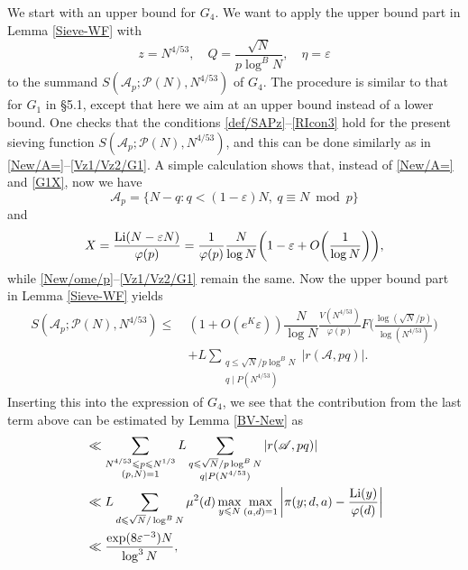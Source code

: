 \documentclass[12pt, a4paper]{amsart}
\def\Li{\hbox{{\rm Li}}}
\def\le{\leqslant}
\theoremstyle{plain}
\theoremstyle{remark}
\numberwithin{equation}{section}
\begin{document}
We start with an upper bound for $G_4$. We want to apply the upper bound part 
in Lemma \ref{Sieve-WF} with
\[
z=N^{4/53},\quad Q=\frac{\sqrt{N}}{p \log^{B} N},\quad \eta=\varepsilon
\] 
to the summand $S(\mathscr{A}_{p};\mathscr{P}(N), N^{4/53})$ of $G_4$. The procedure is 
similar to that for $G_1$ in \S 5.1, except that here we aim at an upper bound instead of a lower bound. 
One checks that the conditions \eqref{def/SAPz}--\eqref{RIcon3} hold for the present sieving function 
$S(\mathscr{A}_{p};\mathscr{P}(N), N^{4/53})$, and this can be done similarly as in 
\eqref{New/A=}--\eqref{Vz1/Vz2/G1}. A simple calculation shows that, 
instead of \eqref{New/A=} and \eqref{G1X}, now we have 
\begin{equation}\label{New/A=/G4}
\mathscr{A}_p=\{N-q: q<(1-\varepsilon)N, \ q\equiv N \bmod{p}\} 
\end{equation}
and 
\begin{equation}\label{G1X/G4}
X=\frac{\Li(N-\varepsilon N)}{\varphi(p)}
= \frac{1}{\varphi(p)} \frac{N}{\log N} \bigg(1-\varepsilon+O\bigg(\dfrac{1}{\log N}\bigg)\bigg), 
\end{equation}
while \eqref{New/ome/p}--\eqref{Vz1/Vz2/G1} remain the same. Now the upper bound part 
in Lemma \ref{Sieve-WF} yields 
\begin{equation}
\begin{split} 
S(\mathscr{A}_{p};\mathscr{P}(N), N^{4/53})
\le\ &  
(1+O(e^K\varepsilon))\dfrac{N}{\log N} 
\frac{V(N^{4/53})}{\varphi(p)} F\bigg(\frac{\log (\sqrt{N} / p)}{\log (N^{4/53})}\bigg) \\ 
& + L \sum\limits_{\substack{q\le\sqrt{N} /p\log^{B} N\\ q\mid P(N^{4/53})}}|r(\mathscr{A}, pq)|. 
\end{split}  
\end{equation}
Inserting this into the expression of $G_4$, we see that the contribution from the last term above 
can be estimated by Lemma \ref{BV-New} as 
\begin{equation}
\begin{split} 
&\ll\sum\limits_{\substack{N^{4/53}\le p\le N^{1/3}\\(p, N)=1}}L
\sum\limits_{\substack{q\le\sqrt{N} /p \log^{B} N\\ q\mid P(N^{4/53})}}|r(\mathscr{A}, pq)|\\ 
&\ll L\sum\limits_{d\le\sqrt{N} /\log^{B} N}\mu^{2}(d)\max\limits _{y\le N}\max\limits _{(a,d)=1} 
\bigg|\pi(y ;d,a)-\frac{\Li(y)}{\varphi(d)}\bigg|\\
&\ll \frac{\exp(8\varepsilon^{-3})N}{\log^3 N},  
\end{split}  
\end{equation}
\end{document}
